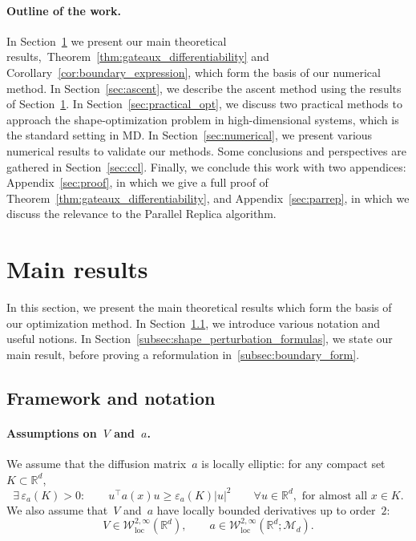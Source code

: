 \documentclass[a4]{article}
\newcommand{\R}{\mathbb{R}}
\newcommand{\1}{\mathbbm 1}
\newcommand{\cW}{\mathcal{W}}
\begin{document}
    \paragraph{Outline of the work.}
    In Section~\ref{sec:main_result} we present our main theoretical results,~Theorem~\ref{thm:gateaux_differentiability} and Corollary~\ref{cor:boundary_expression}, which form the basis of our numerical method.
    In Section~\ref{sec:ascent}, we describe the ascent method using the results of Section~\ref{sec:main_result}.
    In Section~\ref{sec:practical_opt}, we discuss two practical methods to approach the shape-optimization problem in high-dimensional systems, which is the standard setting in MD.
    In Section~\ref{sec:numerical}, we present various numerical results to validate our methods.
    Some conclusions and perspectives are gathered in Section~\ref{sec:ccl}. Finally, we conclude this work with two appendices: Appendix~\ref{sec:proof}, in which we give a full proof of Theorem~\ref{thm:gateaux_differentiability}, and Appendix~\ref{sec:parrep}, in which we discuss the relevance to the Parallel Replica algorithm.

    \section{Main results}
    \label{sec:main_result}
    In this section, we present the main theoretical results which form the basis of our optimization method. In Section~\ref{subsec:framework}, we introduce various notation and useful notions. In Section~\ref{subsec:shape_perturbation_formulas}, we state our main result, before proving a reformulation in~\ref{subsec:boundary_form}.

    \subsection{Framework and notation}
    \label{subsec:framework}
        \paragraph{Assumptions on~$V$ and~$a$.}
        We assume that the diffusion matrix~$a$ is locally elliptic: for any compact set~$K\subset \R^d$,
        \begin{equation}
            \label{eq:a_ellipticity}
            \tag{\bf Ell}
            \exists\,\varepsilon_a(K)>0:\qquad u^\top a(x) u \geq \varepsilon_a(K) |u|^2\qquad\forall u\in \R^d,\text{ for almost all~$x\in K$}.
        \end{equation}
        We also assume that~$V$ and~$a$ have locally bounded derivatives up to order~$2$:
        \begin{equation}
            \label{eq:coeff_regularity}
            \tag{\bf Reg}
            V\in \cW_{\mathrm{loc}}^{2,\infty}\left(\R^d\right),\qquad a\in \cW_{\mathrm{loc}}^{2,\infty}(\R^d;\mathcal M_d).
        \end{equation}
\end{document}
